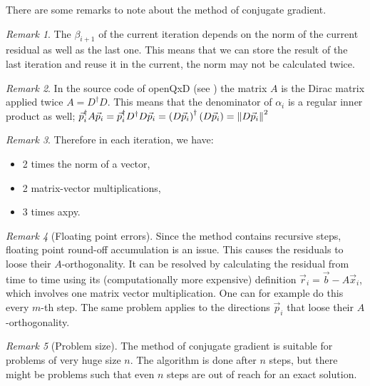 \documentclass{article}
\theoremstyle{plain} %
\theoremstyle{convention} %
\theoremstyle{remark} %
\newtheorem*{remark}{Remark} %
\numberwithin{equation}{section}
\begin{document}
There are some remarks to note about the method of conjugate gradient.

\begin{remark}
    The $\beta_{i+1}$ of the current iteration depends on the norm of the current residual as well as the last one. This means that we can store the result of the last iteration and reuse it in the current, the norm may not be calculated twice.
\end{remark}

\begin{remark}
    In the source code of openQxD (see \cite{openqxd}) the matrix $A$ is the Dirac matrix applied twice $A = D^{\dagger} D$. This means that the denominator of $\alpha_i$ is a regular inner product as well; $\vec{p}_i^{\dagger} A \vec{p}_i = \vec{p}_i^{\dagger} D^{\dagger} D \vec{p}_i = \left( D \vec{p}_i \right)^{\dagger} \left( D \vec{p}_i \right) = \norm{ D \vec{p}_i }^2$
\end{remark}

\begin{remark}
    Therefore in each iteration, we have:
    \begin{itemize}
        \item 2 times the norm of a vector,
        \item 2 matrix-vector multiplications,
        \item 3 times axpy.\footnotemark
    \end{itemize}
\end{remark}


\begin{remark}[Floating point errors]
    Since the method contains recursive steps, floating point round-off accumulation is an issue. This causes the residuals to loose their $A$-orthogonality. It can be resolved by calculating the residual from time to time using its (computationally more expensive) definition $\vec{r}_i = \vec{b} - A \vec{x}_i$, which involves one matrix vector multiplication. One can for example do this every $m$-th step. The same problem applies to the directions $\vec{p}_i$ that loose their $A$-orthogonality.
\end{remark}

\begin{remark}[Problem size]
    The method of conjugate gradient is suitable for problems of very huge size $n$. The algorithm is done after $n$ steps, but there might be problems such that even $n$ steps are out of reach for an exact solution.
\end{remark}
\end{document}

